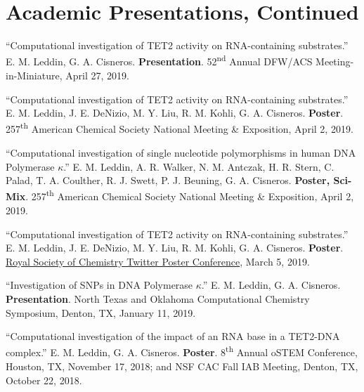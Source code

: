 \documentclass[letterpaper,11pt]{article}
\begin{document}
\newpage
{}
\fancyfoot[C]{\thepage}


\section{Academic Presentations, Continued}
\begin{etaremune}[start=11]
\small{
  \item \textnormal{``Computational investigation of TET2 activity on RNA-containing substrates.'' E. M. Leddin, G. A. Cisneros. \textbf{Presentation}. 52\textsuperscript{nd} Annual DFW/ACS Meeting-in-Miniature, April 27, 2019.}
  \item \textnormal{``Computational investigation of TET2 activity on RNA-containing substrates.'' E. M. Leddin, J. E. DeNizio, M. Y. Liu, R. M. Kohli, G. A. Cisneros. \textbf{Poster}. 257\textsuperscript{th} American Chemical Society National Meeting \& Exposition, April 2, 2019.}
  \item \textnormal{``Computational investigation of single nucleotide polymorphisms in human DNA Polymerase $\kappa$.'' E. M. Leddin, A. R. Walker, N. M. Antczak, H. R. Stern, C. Palad, T. A. Coulther, R. J. Swett, P. J. Beuning, G. A. Cisneros. \textbf{Poster, Sci-Mix}. 257\textsuperscript{th} American Chemical Society National Meeting \& Exposition, April 2, 2019.}
  \item \textnormal{``Computational investigation of TET2 activity on RNA-containing substrates.'' E. M. Leddin, J. E. DeNizio, M. Y. Liu, R. M. Kohli, G. A. Cisneros. \textbf{Poster}. \href{https://twitter.com/EmLedd1/status/1103107933951459333?s=20}{Royal Society of Chemistry Twitter Poster Conference}, March 5, 2019.}
  \item \textnormal{``Investigation of SNPs in DNA Polymerase $\kappa$.'' E. M. Leddin, G. A. Cisneros. \textbf{Presentation}. North Texas and Oklahoma Computational Chemistry Symposium, Denton, TX, January 11, 2019.}
  \item \textnormal{``Computational investigation of the impact of an RNA base in a TET2-DNA complex.'' E. M. Leddin, G. A. Cisneros. \textbf{Poster}. 8\textsuperscript{th} Annual oSTEM Conference, Houston, TX, November 17, 2018; and NSF CAC Fall IAB Meeting, Denton, TX, October 22, 2018.}
}
\end{etaremune}
\end{document}

